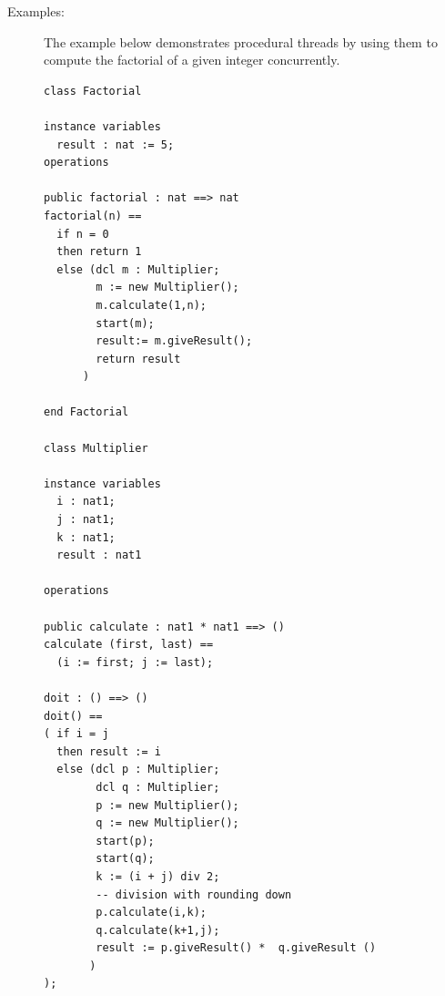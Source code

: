 \documentclass{overturerepchap}
\begin{document}
\begin{description}
%
%
\item[Examples:]  \mbox{}
The example below demonstrates procedural threads by using them to
compute the factorial of a given integer concurrently. 

\begin{lstlisting}
class Factorial

instance variables
  result : nat := 5;
operations

public factorial : nat ==> nat
factorial(n) == 
  if n = 0 
  then return 1
  else (dcl m : Multiplier;
        m := new Multiplier();
        m.calculate(1,n);
        start(m);
        result:= m.giveResult();
        return result
      )

end Factorial

class Multiplier

instance variables
  i : nat1;
  j : nat1; 
  k : nat1;  
  result : nat1

operations

public calculate : nat1 * nat1 ==> ()
calculate (first, last) ==  
  (i := first; j := last);

doit : () ==> ()
doit() ==
( if i = j 
  then result := i
  else (dcl p : Multiplier;
        dcl q : Multiplier;
        p := new Multiplier();  
        q := new Multiplier();  
        start(p);
        start(q);  
        k := (i + j) div 2;
        -- division with rounding down
        p.calculate(i,k);  
        q.calculate(k+1,j);  
        result := p.giveResult() *  q.giveResult ()
       )
);


\end{lstlisting}
\end{description}
\end{document}
